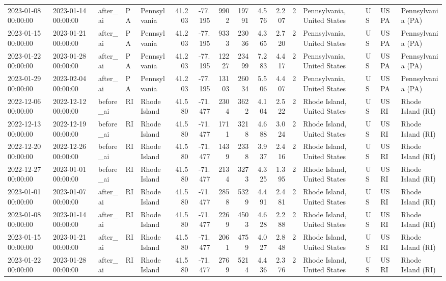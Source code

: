 \begin{tabular}{lllllrrrrrrlllll}
2023-01-08 00:00:00 & 2023-01-14 00:00:00 & after\_ai & PA & Pennsylvania & 41.203 & -77.195 & 9902 & 19791 & 4.576 & 2.207 & 2 & Pennsylvania, United States & US & USPA & Pennsylvania (PA) \\
2023-01-15 00:00:00 & 2023-01-21 00:00:00 & after\_ai & PA & Pennsylvania & 41.203 & -77.195 & 9333 & 23036 & 4.365 & 2.720 & 2 & Pennsylvania, United States & US & USPA & Pennsylvania (PA) \\
2023-01-22 00:00:00 & 2023-01-28 00:00:00 & after\_ai & PA & Pennsylvania & 41.203 & -77.195 & 12227 & 23499 & 7.283 & 4.417 & 2 & Pennsylvania, United States & US & USPA & Pennsylvania (PA) \\
2023-01-29 00:00:00 & 2023-02-04 00:00:00 & after\_ai & PA & Pennsylvania & 41.203 & -77.195 & 13103 & 26034 & 5.506 & 4.407 & 2 & Pennsylvania, United States & US & USPA & Pennsylvania (PA) \\
2022-12-06 00:00:00 & 2022-12-12 00:00:00 & before\_ai & RI & Rhode Island & 41.580 & -71.477 & 2304 & 3622 & 4.104 & 2.522 & 2 & Rhode Island, United States & US & USRI & Rhode Island (RI) \\
2022-12-13 00:00:00 & 2022-12-19 00:00:00 & before\_ai & RI & Rhode Island & 41.580 & -71.477 & 1711 & 3218 & 4.688 & 3.024 & 2 & Rhode Island, United States & US & USRI & Rhode Island (RI) \\
2022-12-20 00:00:00 & 2022-12-26 00:00:00 & before\_ai & RI & Rhode Island & 41.580 & -71.477 & 1439 & 2338 & 3.937 & 2.416 & 2 & Rhode Island, United States & US & USRI & Rhode Island (RI) \\
2022-12-27 00:00:00 & 2023-01-01 00:00:00 & before\_ai & RI & Rhode Island & 41.580 & -71.477 & 2134 & 3273 & 4.325 & 1.395 & 2 & Rhode Island, United States & US & USRI & Rhode Island (RI) \\
2023-01-01 00:00:00 & 2023-01-07 00:00:00 & after\_ai & RI & Rhode Island & 41.580 & -71.477 & 2858 & 5329 & 4.491 & 2.481 & 2 & Rhode Island, United States & US & USRI & Rhode Island (RI) \\
2023-01-08 00:00:00 & 2023-01-14 00:00:00 & after\_ai & RI & Rhode Island & 41.580 & -71.477 & 2269 & 4503 & 4.628 & 2.288 & 2 & Rhode Island, United States & US & USRI & Rhode Island (RI) \\
2023-01-15 00:00:00 & 2023-01-21 00:00:00 & after\_ai & RI & Rhode Island & 41.580 & -71.477 & 2061 & 4759 & 4.027 & 2.848 & 2 & Rhode Island, United States & US & USRI & Rhode Island (RI) \\
2023-01-22 00:00:00 & 2023-01-28 00:00:00 & after\_ai & RI & Rhode Island & 41.580 & -71.477 & 2769 & 5214 & 4.436 & 2.376 & 2 & Rhode Island, United States & US & USRI & Rhode Island (RI) \\

\end{tabular}
